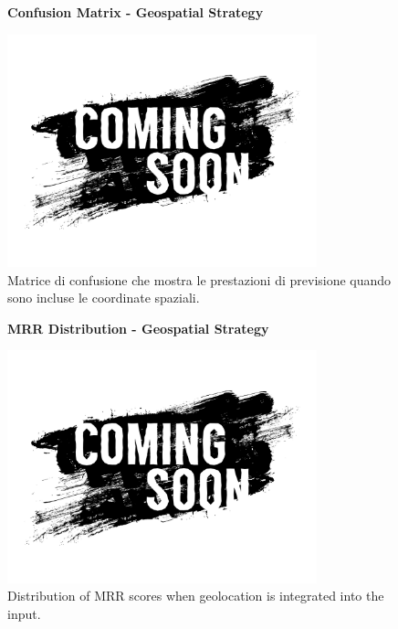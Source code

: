 \documentclass[12pt,a4paper]{article}
\begin{document}
\begin{enumerate}
\begin{figure}[H]
\centering
\textbf{Confusion Matrix - Geospatial Strategy}\par
\vspace{0.5em}
\includegraphics[width=0.8\textwidth]{../../img/SPACE-GEO_n-1_come_current_POI/tmp.jpg}
\caption{Matrice di confusione che mostra le prestazioni di previsione quando sono incluse le coordinate spaziali.}
\label{fig:geospatial_confusion}
\end{figure}

\begin{figure}[H]
\centering
\textbf{MRR Distribution - Geospatial Strategy}\par
\vspace{0.5em}
\includegraphics[width=0.8\textwidth]{../../img/SPACE-GEO_n-1_come_current_POI/tmp.jpg}
\caption{Distribution of MRR scores when geolocation is integrated into the input.}
\label{fig:geospatial_mrr}
\end{figure}


\end{enumerate}
\end{document}
